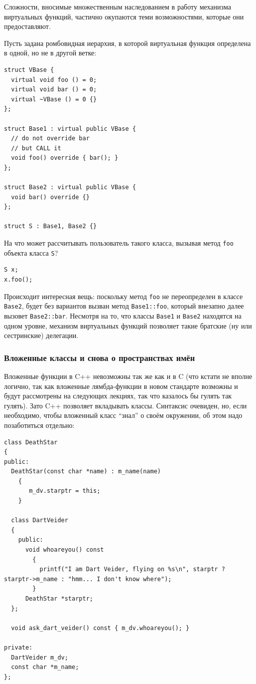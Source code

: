 \documentclass[a4paper,12pt,oneside]{article}
\begin{document}
Сложности, вносимые множественным наследованием в работу механизма виртуальных функций, частично окупаются теми возможностями, которые они предоставляют.

Пусть задана ромбовидная иерархия, в которой виртуальная функция определена в одной, но не в другой ветке:

\begin{lstlisting}
struct VBase {
  virtual void foo () = 0;
  virtual void bar () = 0;
  virtual ~VBase () = 0 {}
};

struct Base1 : virtual public VBase {
  // do not override bar
  // but CALL it
  void foo() override { bar(); }  
};

struct Base2 : virtual public VBase {
  void bar() override {}
};

struct S : Base1, Base2 {}
\end{lstlisting}

На что может рассчитывать пользователь такого класса, вызывая метод \lstinline!foo! объекта класса \lstinline!S!?

\begin{lstlisting}
S x;
x.foo();
\end{lstlisting}

Происходит интересная вещь: поскольку метод \lstinline!foo! не переопределен в классе \lstinline!Base2!, будет без вариантов вызван метод \lstinline!Base1::foo!, который внезапно далее вызовет \lstinline!Base2::bar!. Несмотря на то, что классы \lstinline!Base1! и \lstinline!Base2! находятся на одном уровне, механизм виртуальных функций позволяет такие братские (ну или сестринские) делегации.

\subsubsection{Вложенные классы и снова о пространствах имён}\label{InnerClasses}

Вложенные функции в C++ невозможны так же как и в C (что кстати не вполне логично, так как вложенные лямбда-функции в новом стандарте возможны и будут рассмотрены на следующих лекциях, так что казалось бы гулять так гулять). Зато C++ позволяет вкладывать классы. Синтаксис очевиден, но, если необходимо, чтобы вложенный класс ``знал'' о своём окружении, об этом надо позаботиться отдельно:

\begin{lstlisting}
class DeathStar
{
public:
  DeathStar(const char *name) : m_name(name)
    {
       m_dv.starptr = this;
    }

  class DartVeider
  {
    public:
      void whoareyou() const
        {
          printf("I am Dart Veider, flying on %s\n", starptr ? starptr->m_name : "hmm... I don't know where");
        }
      DeathStar *starptr;    
  };

  void ask_dart_veider() const { m_dv.whoareyou(); }

private:
  DartVeider m_dv;
  const char *m_name;
};
\end{lstlisting}
\end{document}

